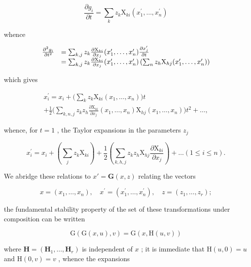 \[
\frac {\partial g _ {i}}{\partial t} = \sum_ {k} z _ {k} \mathrm{X} _ {k i} (x _ {1} ^ {\prime}, \dots , x _ {n} ^ {\prime})
\]

whence

\[
\begin{array}{r l} \frac {\partial^ {2} g _ {i}}{\partial t ^ {2}} & = \sum_ {k, j} z _ {k} \frac {\partial \mathrm{X} _ {k i}}{\partial x _ {j}} (x _ {1} ^ {\prime}, \ldots , x _ {n} ^ {\prime}) \frac {\partial x _ {j} ^ {\prime}}{\partial t} \\ & = \sum_ {k, j} z _ {k} \frac {\partial \mathrm{X} _ {k i}}{\partial x _ {j}} (x _ {1} ^ {\prime}, \ldots , x _ {n} ^ {\prime}) \left(\sum_ {n} z _ {h} \mathrm{X} _ {h j} (x _ {1} ^ {\prime}, \ldots , x _ {n} ^ {\prime})\right) \end{array}
\]

which gives

\[
\begin{array}{r} x _ {i} ^ {\prime} = x _ {i} + \Big (\sum_ {k} z _ {k} \mathrm{X} _ {k i} (x _ {1}, \ldots , x _ {n}) \Big) t \\ + \frac {1}{2} \Big (\sum_ {k, n, j} z _ {k} z _ {h} \frac {\partial \mathrm{X} _ {k i}}{\partial x _ {j}} (x _ {1}, \ldots , x _ {n}) \mathrm{X} _ {h j} (x _ {1}, \ldots , x _ {n}) \Big) t ^ {2} + \dots , \end{array}
\]

whence, for \(t = 1\) , the Taylor expansions in the parameters \(z_{j}\)

\[
x _ {i} ^ {\prime} = x _ {i} + \left(\sum_ {j} z _ {k} \mathrm{X} _ {k i}\right) + \frac {1}{2} \left(\sum_ {k, h, j} z _ {k} z _ {h} \mathrm{X} _ {h j} \frac {\partial \mathrm{X} _ {k i}}{\partial x _ {j}}\right) + \dots (1 \leqslant i \leqslant n).\tag{9}
\]

We abridge these relations to \(x' = \mathbf{G}(x, z)\) relating the vectors

\[
x = (x _ {1}, \dots , x _ {n}), \quad x ^ {\prime} = (x _ {1} ^ {\prime}, \dots , x _ {n} ^ {\prime}), \quad z = (z _ {1}, \dots , z _ {r});
\]

the fundamental stability property of the set of these transformations under composition can be written

\[
\mathrm{G} (\mathrm{G} (x, u), v) = \mathrm{G} (x, \mathrm{H} (u, v))\tag{10}
\]

where \(\mathbf{H} = (\mathbf{H}_1, \ldots, \mathbf{H}_r)\) is independent of \(x\) ; it is immediate that \(\mathrm{H}(u, 0) = u\) and \(\mathrm{H}(0, v) = v\) , whence the expansions

